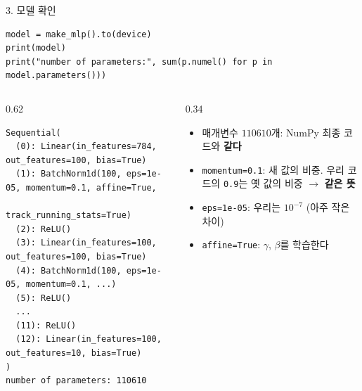 \documentclass[aspectratio=169,11pt]{beamer}
\newcommand{\codetiny}{\ttfamily\fontsize{6.8}{7.6}\selectfont}
\newcommand{\code}[1]{\texttt{#1}}
\begin{document}
\begin{frame}[fragile]{3. 모델 확인}
\begin{lstlisting}
model = make_mlp().to(device)
print(model)
print("number of parameters:", sum(p.numel() for p in model.parameters()))
\end{lstlisting}
\begin{columns}[T,onlytextwidth]
\begin{column}{0.62\textwidth}
\begin{lstlisting}[style=outstyle,basicstyle=\codetiny]
Sequential(
  (0): Linear(in_features=784, out_features=100, bias=True)
  (1): BatchNorm1d(100, eps=1e-05, momentum=0.1, affine=True,
                   track_running_stats=True)
  (2): ReLU()
  (3): Linear(in_features=100, out_features=100, bias=True)
  (4): BatchNorm1d(100, eps=1e-05, momentum=0.1, ...)
  (5): ReLU()
  ...
  (11): ReLU()
  (12): Linear(in_features=100, out_features=10, bias=True)
)
number of parameters: 110610
\end{lstlisting}
\end{column}
\begin{column}{0.34\textwidth}
\small
\begin{itemize}
\item 매개변수 $110610$개: NumPy 최종 코드와 \textbf{같다}
\item \code{momentum=0.1}: 새 값의 비중. 우리 코드의 \code{0.9}는 옛 값의 비중 $\to$ \textbf{같은 뜻}
\item \code{eps=1e-05}: 우리는 $10^{-7}$ (아주 작은 차이)
\item \code{affine=True}: $\gamma$, $\beta$를 학습한다
\end{itemize}
\end{column}
\end{columns}
\end{frame}
\end{document}

